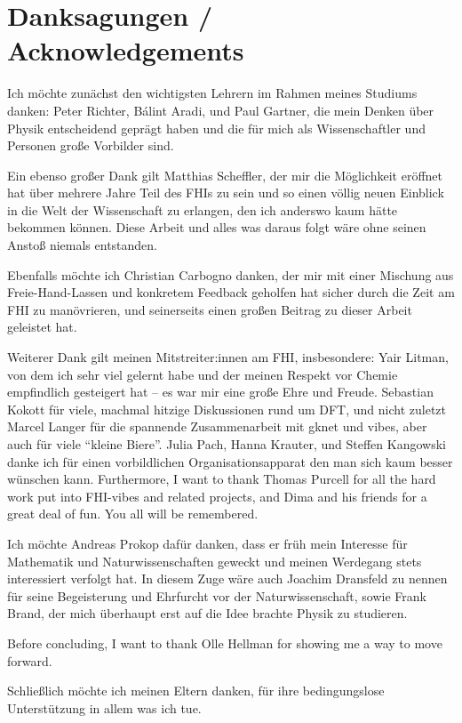 \chapter{Danksagungen / Acknowledgements}

Ich möchte zunächst den wichtigsten Lehrern im Rahmen meines Studiums danken: Peter Richter, Bálint Aradi, und Paul Gartner, die mein Denken über Physik entscheidend geprägt haben und die für mich als Wissenschaftler und Personen große Vorbilder sind.

Ein ebenso großer Dank gilt Matthias Scheffler, der mir die Möglichkeit eröffnet hat über mehrere Jahre Teil des FHIs zu sein und so einen völlig neuen Einblick in die Welt der Wissenschaft zu erlangen, den ich anderswo kaum hätte bekommen können. Diese Arbeit und alles was daraus folgt wäre ohne seinen Anstoß niemals entstanden.

Ebenfalls möchte ich Christian Carbogno danken, der mir mit einer Mischung aus Freie-Hand-Lassen und konkretem Feedback geholfen hat sicher durch die Zeit am FHI zu manövrieren, und seinerseits einen großen Beitrag zu dieser Arbeit geleistet hat.

Weiterer Dank gilt meinen Mitstreiter:innen am FHI, insbesondere: Yair Litman, von dem ich sehr viel gelernt habe und der meinen Respekt vor Chemie empfindlich gesteigert hat -- es war mir eine große Ehre und Freude. Sebastian Kokott für viele, machmal hitzige Diskussionen rund um DFT, und nicht zuletzt Marcel Langer für die spannende Zusammenarbeit mit gknet und vibes, aber auch für viele ``kleine Biere''. Julia Pach, Hanna Krauter, und Steffen Kangowski danke ich für einen vorbildlichen Organisationsapparat den man sich kaum besser wünschen kann. 
Furthermore, I want to thank Thomas Purcell for all the hard work put into FHI-vibes and related projects, and Dima and his friends for a great deal of fun. You all will be remembered.

Ich möchte Andreas Prokop dafür danken, dass er früh mein Interesse für Mathematik und Naturwissenschaften geweckt und meinen Werdegang stets interessiert verfolgt hat. In diesem Zuge wäre auch Joachim Dransfeld zu nennen für seine Begeisterung und Ehrfurcht vor der Naturwissenschaft, sowie Frank Brand, der mich überhaupt erst auf die Idee brachte Physik zu studieren.

Before concluding, I want to thank Olle Hellman for showing me a way to move forward.

Schließlich möchte ich meinen Eltern danken, für ihre bedingungslose Unterstützung in allem was ich tue.
